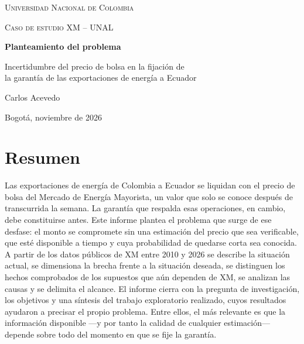 \documentclass[11pt,letterpaper]{article}
\begin{document}
\begin{titlepage}
  \centering
  \vspace*{1cm}
  {\large\scshape Universidad Nacional de Colombia\par}
  \vspace{0.2cm}
  {\scshape Caso de estudio XM -- UNAL\par}
  \vspace{3cm}
  {\LARGE\bfseries Planteamiento del problema\par}
  \vspace{0.6cm}
  {\Large Incertidumbre del precio de bolsa en la fijación de\\[2pt]
  la garantía de las exportaciones de energía a Ecuador\par}
  \vspace{3cm}
  {\large Carlos Acevedo\par}
  \vfill
  {Bogotá, noviembre de 2026\par}
\end{titlepage}

\tableofcontents
\newpage

\section*{Resumen}
\noindent
Las exportaciones de energía de Colombia a Ecuador se liquidan con el
precio de bolsa del Mercado de Energía Mayorista, un valor que solo se
conoce después de transcurrida la semana. La garantía que respalda esas
operaciones, en cambio, debe constituirse antes. Este informe plantea el
problema que surge de ese desfase: el monto se compromete sin una
estimación del precio que sea verificable, que esté disponible a tiempo
y cuya probabilidad de quedarse corta sea conocida. A partir de los
datos públicos de XM entre 2010 y 2026 se describe la situación actual,
se dimensiona la brecha frente a la situación deseada, se distinguen los
hechos comprobados de los supuestos que aún dependen de XM, se analizan
las causas y se delimita el alcance. El informe cierra con la pregunta
de investigación, los objetivos y una síntesis del trabajo exploratorio
realizado, cuyos resultados ayudaron a precisar el propio problema. Entre
ellos, el más relevante es que la información disponible ---y por tanto
la calidad de cualquier estimación--- depende sobre todo del momento en
que se fije la garantía.
\end{document}
